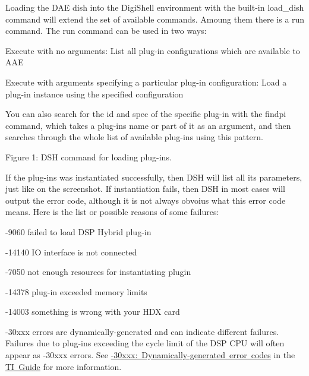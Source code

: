 Loading the D\+AE dish into the Digi\+Shell environment with the built-\/in {\ttfamily load\+\_\+dish} command will extend the set of available commands. Amoung them there is a {\ttfamily run} command. The {\ttfamily run} command can be used in two ways\+:


\begin{DoxyItemize}
\item Execute with no arguments\+: List all plug-\/in configurations which are available to A\+AE  
\item Execute with arguments specifying a particular plug-\/in configuration\+: Load a plug-\/in instance using the specified configuration  
\end{DoxyItemize}

You can also search for the id and spec of the specific plug-\/in with the {\ttfamily findpi} command, which takes a plug-\/in\textquotesingle{}s name or part of it as an argument, and then searches through the whole list of available plug-\/ins using this pattern.

 Figure 1\+: D\+SH command for loading plug-\/ins.

If the plug-\/ins was instantiated successfully, then D\+SH will list all its parameters, just like on the screenshot. If instantiation fails, then D\+SH in most cases will output the error code, although it is not always obvoius what this error code means. Here is the list or possible reasons of some failures\+: 
\begin{DoxyItemize}
\item -\/9060 failed to load D\+SP Hybrid plug-\/in ~\newline
  
\item -\/14140 IO interface is not connected ~\newline
  
\item -\/7050 not enough resources for instantiating plugin ~\newline
  
\item -\/14378 plug-\/in exceeded memory limits ~\newline
  
\item -\/14003 something is wrong with your H\+DX card ~\newline
  
\end{DoxyItemize}

-\/30xxx errors are dynamically-\/generated and can indicate different failures. Failures due to plug-\/ins exceeding the cycle limit of the D\+SP C\+PU will often appear as -\/30xxx errors. See \mbox{\hyperlink{a00832_subsection__30xxx_dynamic_error_codes}{-\/30xxx\+: Dynamically-\/generated error codes}} in the \mbox{\hyperlink{a00832}{TI Guide}} for more information.

